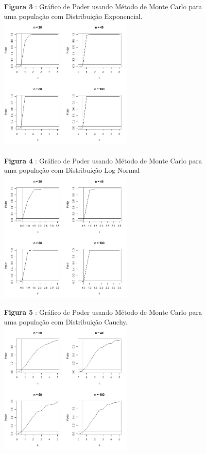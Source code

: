 \documentclass[a4paper,12pt]{article}
\begin{document}
\begin{figure}[H]
	\centering
	\textbf{Figura 3} : Gráfico de Poder usando Método de Monte Carlo para uma população com Distribuição Exponencial.
	\includegraphics[width=0.60\textwidth]{Exponencial.jpeg}\\~\\
	\textbf{Figura 4} : Gráfico de Poder usando Método de Monte Carlo para uma população com Distribuição Log Normal
	\includegraphics[width=0.60\textwidth]{LogNormal.jpeg}
	\label{Rotulo}
\end{figure}

\begin{figure}[H]
	\centering
	\textbf{Figura 5} : Gráfico de Poder usando Método de Monte Carlo para uma população com Distribuição Cauchy.
	\includegraphics[width=0.60\textwidth]{Cauchy.jpeg}
	\label{Rotulo}
\end{figure}
\end{document}
